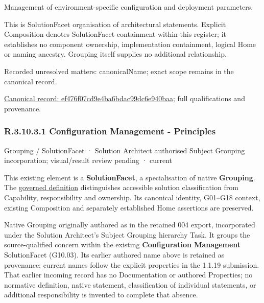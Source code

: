 Management of environment-specific configuration and deployment parameters.



This is SolutionFacet organisation of architectural statements. Explicit Composition denotes SolutionFacet containment within this register; it establishes no component ownership, implementation containment, logical Home or naming ancestry. Grouping itself supplies no additional relationship.


{\small Recorded unresolved matters: canonicalName; exact scope remains in the canonical record.}\par
{\footnotesize \href{../../../../../../../continuum/grouping/ef476f07cd9e4ba6bdac99dc6e940baa.md}{Canonical record: ef476f07cd9e4ba6bdac99dc6e940baa}; full qualifications and provenance.}\par
\subsubsection*{R.3.10.3.1 Configuration Management - Principles}
\label{navigation:R.3.10.3.1}

\label{element:f6985401675b47c0a1c480aa156aaa0c}
{\small Grouping / SolutionFacet · Solution Architect authorised Subject Grouping incorporation; visual/result review pending · current}\par

This existing element is a \textbf{SolutionFacet}, a specialisation of native
\textbf{Grouping}. The \href{\detokenize{../../../../../../../governance/continuum-representation.md#solutionfacet-classification--1119-candidate}}{governed definition}
distinguishes accessible solution classification from Capability, responsibility
and ownership. Its canonical identity, G01–G18 context, existing Composition
and separately established Home assertions are preserved.



Native Grouping originally authored as \texttt{} in the retained 004 export,
incorporated under the Solution Architect's Subject Grouping hierarchy Task.
It groups the source-qualified \texttt{} concern within
the existing \textbf{Configuration Management} SolutionFacet (G10.03). Its earlier authored name above is retained as provenance; current names
follow the explicit properties in the 1.1.19 submission.
That earlier incoming record has no Documentation or authored Properties; no normative
definition, native statement, classification of individual statements, or
additional responsibility is invented to complete that absence.



